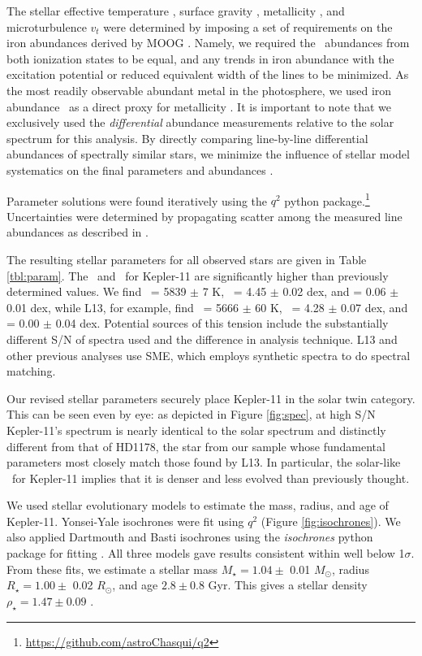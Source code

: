 \documentclass[oneside]{emulateapj}
\begin{document}
The stellar effective temperature \teff, surface gravity \logg, metallicity \mh, and microturbulence $v_t$ were determined by imposing a set of requirements on the iron abundances derived by MOOG \citep{Sneden1973}. Namely, we required the \feh\ abundances from both ionization states to be equal, and any trends in iron abundance with the excitation potential or reduced equivalent width of the lines to be minimized. As the most readily observable abundant metal in the photosphere, we used iron abundance \feh\ as a direct proxy for metallicity \mh. It is important to note that we exclusively used the \textit{differential} abundance measurements relative to the solar spectrum for this analysis. By directly comparing line-by-line differential abundances of spectrally similar stars, we minimize the influence of stellar model systematics on the final parameters and abundances \citep[see e.g.][]{Ramirez2014}. 

Parameter solutions were found iteratively using the $q^2$ python package.\footnote{\url{https://github.com/astroChasqui/q2}} Uncertainties were determined by propagating scatter among the measured line abundances as described in \citet{Epstein2010, Bensby2014}.

The resulting stellar parameters for all observed stars are given in Table \ref{tbl:param}. The \teff\ and \logg\ for Kepler-11 are significantly higher than previously determined values. We find  \teff\ = 5839 $\pm$ 7 K, \logg\ = 4.45 $\pm$ 0.02 dex, and \feh = 0.06 $\pm$ 0.01 dex, while L13, for example, find \teff\ = 5666 $\pm$ 60 K, \logg\ = 4.28 $\pm$ 0.07 dex, and \feh = 0.00 $\pm$ 0.04 dex. Potential sources of this tension include the substantially different S/N of spectra used and the difference in analysis technique. L13 and other previous analyses use SME, which employs synthetic spectra to do spectral matching. 

Our revised stellar parameters securely place Kepler-11 in the solar twin category. This can be seen even by eye: as depicted in Figure \ref{fig:spec}, at high S/N Kepler-11's spectrum is nearly identical to the solar spectrum and distinctly different from that of HD1178, the star from our sample whose fundamental parameters most closely match those found by L13. In particular, the solar-like \logg\ for Kepler-11 implies that it is denser and less evolved than previously thought.

We used stellar evolutionary models to estimate the mass, radius, and age of Kepler-11. Yonsei-Yale isochrones were fit using $q^2$ (Figure \ref{fig:isochrones}). We also applied Dartmouth and Basti isochrones using the \textit{isochrones} python package for fitting \citep{Morton2015}. All three models gave results consistent within well below 1$\sigma$. From these fits, we estimate a stellar mass $M_{\star} = 1.04 \pm$ 0.01 $M_{\odot}$, radius $R_{\star} = 1.00 \pm$ 0.02 $R_{\odot}$, and age $2.8 \pm 0.8$ Gyr. This gives a stellar density $\rho_{\star} = 1.47 \pm 0.09$ \gcm.
\end{document}
